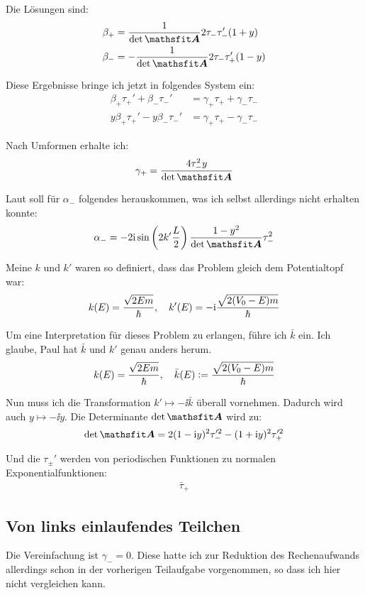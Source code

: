 Die Lösungen sind:
\begin{align*}
	\beta_+ &= \frac1\detA 2 \tau_- \tau_-' (1+y) \\
	\beta_- &= - \frac1\detA 2 \tau_- \tau_+' (1-y) \\
\end{align*}

Diese Ergebnisse bringe ich jetzt in folgendes System ein:
\begin{align*}
	\beta_+ \tau_+' + \beta_- \tau_-'
	&= \gamma_+ \tau_+ + \gamma_- \tau_- \\
	y\beta_+ \tau_+' - y\beta_- \tau_-'
	&= \gamma_+ \tau_+ - \gamma_- \tau_-
\end{align*}

Nach Umformen erhalte ich:
\[
	\gamma_+ = \frac{4 \tau_-^2 y}\detA
\]

Laut \cite[Seite 270]{nolting-theo5} soll für $\alpha_-$ folgendes
herauskommen, was ich selbst allerdings nicht erhalten konnte:
\[
	\alpha_- = - 2 \ii \sin\del{2 k' \frac L2} \frac{1-y^2}\detA \tau_-^2
\]

Meine $k$ und $k'$ waren so definiert, dass das Problem gleich dem
Potentialtopf war:
\[
	k(E) = \frac{\sqrt{2Em}}\hbar
	,\quad
	k'(E) = - \mathrm i \frac{\sqrt{2(V_0-E)m}}\hbar
\]

Um eine Interpretation für dieses Problem zu erlangen, führe ich $\bar k$ ein.
Ich glaube, Paul hat $\bar k$ und $k'$ genau anders herum.
\[
	k(E) = \frac{\sqrt{2Em}}\hbar
	,\quad
	\bar k(E) := \frac{\sqrt{2(V_0-E)m}}\hbar
\]

Nun muss ich die Transformation $k' \mapsto - \ii \bar k$ überall vornehmen.
Dadurch wird auch $y \mapsto -\ii y$. Die Determinante $\detA$ wird zu:
\[
	\detA = 2(1-\ii y)^2 \tau_-^{\prime2} - (1+\ii y)^2 \tau_+^{\prime 2}
\]

Und die $\tau_\pm'$ werden von periodischen Funktionen zu normalen
Exponentialfunktionen:
\begin{align*}
	\bar\tau_+
\end{align*}

\fehlt

\subsection{Von links einlaufendes Teilchen}

Die Vereinfachung ist $\gamma_- = 0$. Diese hatte ich zur Reduktion des
Rechenaufwands allerdings schon in der vorherigen Teilaufgabe vorgenommen, so
dass ich hier nicht vergleichen kann.

